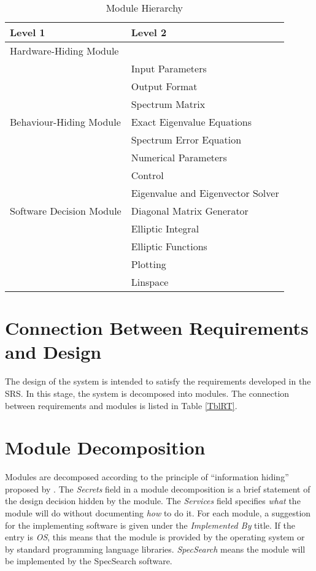 \documentclass[12pt, titlepage]{article}
\newcommand{\progname}{SpecSearch}
\begin{document}
	\begin{table}[h]
		\centering
		\begin{tabular}{p{} p{}}
			\toprule
			\textbf{Level 1} & \textbf{Level 2}\\
			\midrule
			
			{Hardware-Hiding Module} & ~ \\
			\midrule
			
			\multirow{7}{0.3\textwidth}{Behaviour-Hiding Module} 
			& Input Parameters \\
			& Output Format \\
			& Spectrum Matrix \\
			& Exact Eigenvalue Equations \\
			& Spectrum Error Equation \\
			& Numerical Parameters \\  
			& Control \\ 
			\midrule
			
			\multirow{3}{0.3\textwidth}{Software Decision Module} 
			& Eigenvalue and Eigenvector Solver \\
			& Diagonal Matrix Generator\\
			& Elliptic Integral\\ 
			& Elliptic Functions\\ 
			& Plotting \\ 
			& Linspace \\
			\bottomrule
			
		\end{tabular}
		\caption{Module Hierarchy}
		\label{TblMH}
	\end{table}
	
	\newpage 
	\section{Connection Between Requirements and Design} \label{SecConnection}
	
	The design of the system is intended to satisfy the requirements developed 
	in
	the SRS. In this stage, the system is decomposed into modules. The 
	connection
	between requirements and modules is listed in Table \ref{TblRT}.
	
	\section{Module Decomposition} \label{SecMD}
	
	
	Modules are decomposed according to the principle of ``information hiding''
	proposed by \citet{ParnasEtAl1984}. The \emph{Secrets} field in a module
	decomposition is a brief statement of the design decision hidden by the
	module. The \emph{Services} field specifies \emph{what} the module will do
	without documenting \emph{how} to do it. For each module, a suggestion for 
	the
	implementing software is given under the \emph{Implemented By} title. If the
	entry is \emph{OS}, this means that the module is provided by the operating
	system or by standard programming language libraries.  \emph{\progname{}} 
	means 
	the
	module will be implemented by the \progname{} software.
	
\end{document}
